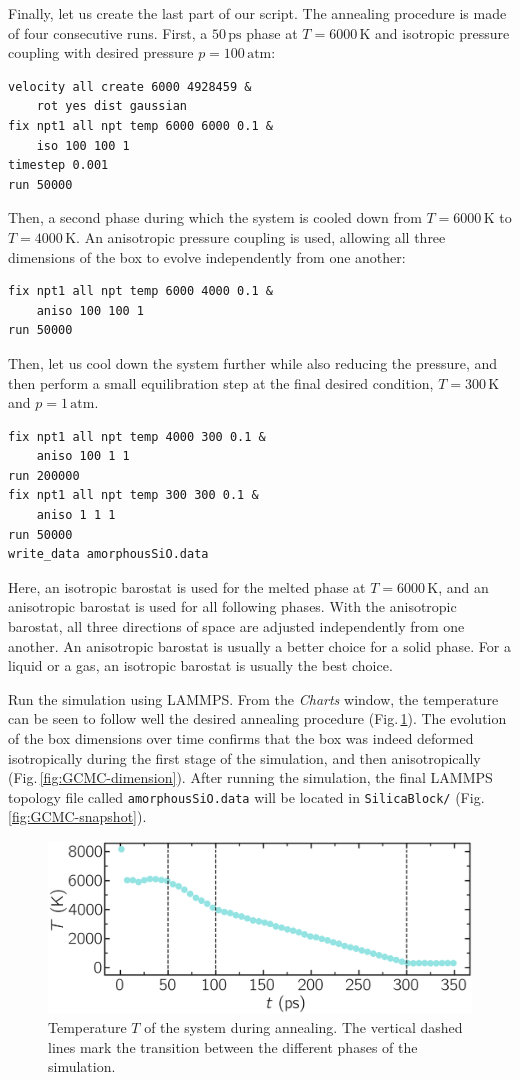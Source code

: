 \documentclass[9pt,tutorial]{livecoms}
\newcommand{\flrcmd}[1]{\textcolor{command}{\texttt{#1}}} %
\newcommand{\flecmd}[1]{\textcolor{command}{\texttt{#1}}} %
\begin{document}
Finally, let us create the last part of our script. The annealing procedure is
made of four consecutive runs. First, a $50\,\text{ps}$ phase at $T = 6000\,\text{K}$
and isotropic pressure coupling with desired pressure $p = 100\,\text{atm}$:
\begin{lstlisting}
velocity all create 6000 4928459 &
    rot yes dist gaussian
fix npt1 all npt temp 6000 6000 0.1 &
    iso 100 100 1
timestep 0.001
run 50000
\end{lstlisting}
Then, a second phase during which the system is cooled down from $T = 6000\,\text{K}$
to $T = 4000\,\text{K}$. An anisotropic pressure coupling is used, allowing all
three dimensions of the box to evolve independently from one another:
\begin{lstlisting}
fix npt1 all npt temp 6000 4000 0.1 &
    aniso 100 100 1
run 50000
\end{lstlisting}
Then, let us cool down the system further while also reducing the pressure, and then
perform a small equilibration step at the final desired condition, $T = 300\,\text{K}$ and $p = 1\,\text{atm}$.
\begin{lstlisting}
fix npt1 all npt temp 4000 300 0.1 &
    aniso 100 1 1
run 200000
fix npt1 all npt temp 300 300 0.1 &
    aniso 1 1 1
run 50000
write_data amorphousSiO.data
\end{lstlisting}
Here, an isotropic barostat is used for the melted phase at $T = 6000\,\text{K}$,
and an anisotropic barostat is used for all following phases. With the anisotropic
barostat, all three directions of space are adjusted independently from one another.
An anisotropic barostat is usually a better choice for a solid phase. For a liquid
or a gas, an isotropic barostat is usually the best choice.

Run the simulation using LAMMPS. From the \textit{Charts} window, the temperature
can be seen to follow well the desired annealing procedure (Fig.\,\ref{fig:GCMC-temperature}).
The evolution of the box dimensions over time confirms that the box was indeed
deformed isotropically during the first stage of the simulation, and then anisotropically
(Fig.\,\ref{fig:GCMC-dimension}). After running
the simulation, the final LAMMPS topology file called \flecmd{amorphousSiO.data}
will be located in \flrcmd{SilicaBlock/} (Fig.\,\ref{fig:GCMC-snapshot}).

\begin{figure}
\centering
\includegraphics[width=\linewidth]{GCMC-temperature}
\caption{Temperature $T$ of the system during annealing. The vertical dashed lines
mark the transition between the different phases of the simulation.}
\label{fig:GCMC-temperature}
\end{figure}
\end{document}
